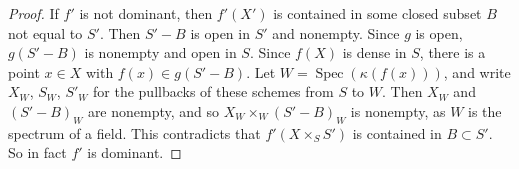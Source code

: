 \documentclass[10pt,a4paper]{amsart}
\theoremstyle{plain}
\theoremstyle{definition}
\theoremstyle{remark}
\numberwithin{equation}{subsection}
\def\Spec{\mathop{\mathrm{Spec}}}
\begin{document}
\begin{proof}
If $f'$ is not dominant, then $f'(X')$ is contained in some closed
subset $B$ not equal to $S'$. Then $S'-B$ is open in $S'$ and nonempty.
Since $g$ is open, $g(S'-B)$ is nonempty and open in $S$. Since $f(X)$
is dense in $S$, there is a point $x\in X$ with $f(x) \in g(S'-B)$.
Let $W = \Spec(\kappa (f(x)))$,
and write $X_W$, $S_W$, $S'_W$ for the pullbacks
of these schemes from $S$ to $W$. Then $X_W$ and $(S'-B)_W$ are nonempty,
and so $X_W \times_W (S'-B)_W$ is nonempty, as $W$ is the spectrum
of a field. This contradicts that $f'(X \times_S S')$ is contained
in $B \subset S'$. So in fact $f'$ is dominant.
\end{proof}
\end{document}
